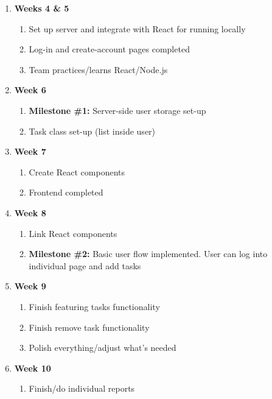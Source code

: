 \documentclass[10pt, letterpaper]{article}
\begin{document}
\begin{enumerate}
	\item \textbf{Weeks 4 \& 5}
	\begin{enumerate}
		\item Set up server and integrate with React for running locally
		\item Log-in and create-account pages completed
		\item Team practices/learns React/Node.js
	\end{enumerate}
	\item \textbf{Week 6}
	\begin{enumerate}
		\item \textbf{Milestone \#1: }Server-side user storage set-up
		\item Task class set-up (list inside user)
	\end{enumerate}
	\item \textbf{Week 7}
	\begin{enumerate}
		\item Create React components
		\item Frontend completed
	\end{enumerate}
	\item \textbf{Week 8}
	\begin{enumerate}
		\item Link React components
		\item \textbf{Milestone \#2: } Basic user flow implemented. User can log into individual page and add tasks
	\end{enumerate}
	\item \textbf{Week 9}
	\begin{enumerate}
		\item Finish featuring tasks functionality
		\item Finish remove task functionality
		\item Polish everything/adjust what's needed
	\end{enumerate}
	\item \textbf{Week 10}
	\begin{enumerate}
		\item Finish/do individual reports
	\end{enumerate}

	
	
\end{enumerate}
\end{document}
